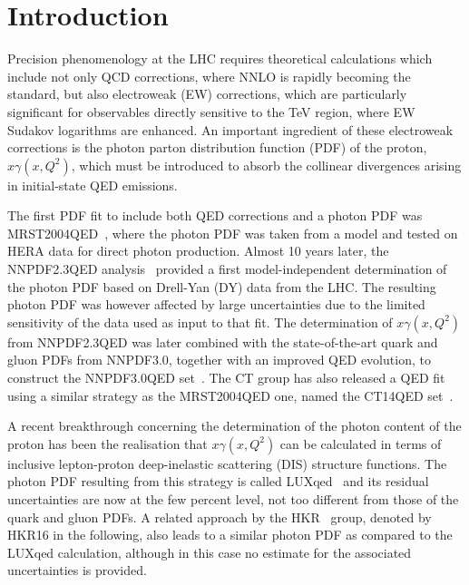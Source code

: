 \section{Introduction}

Precision phenomenology at the LHC requires theoretical calculations
which include not only QCD corrections, where NNLO is rapidly becoming
the standard, but also electroweak (EW) corrections, which are
particularly significant for observables directly sensitive to the TeV
region, where EW Sudakov logarithms are enhanced.
%
An important ingredient of these electroweak corrections is the photon
parton distribution function (PDF) of the proton, $x\gamma(x,Q^2)$, which must be introduced to absorb
the collinear divergences arising in initial-state QED emissions.

The first PDF fit to include both QED corrections and a photon PDF was
MRST2004QED~\cite{Martin:2004dh}, where the photon PDF was taken from
a model and tested on HERA data for direct photon production.
%
Almost 10 years later, the NNPDF2.3QED analysis~\cite{Ball:2012cx,Ball:2013hta} provided a
first model-independent determination of the photon PDF based on
Drell-Yan (DY) data from the LHC.
%
The resulting photon PDF was however affected by large uncertainties
due to the limited sensitivity of the data used as input to that fit.
%
The determination of $x\gamma(x,Q^2)$ from NNPDF2.3QED was later combined
with the state-of-the-art quark and gluon
PDFs from NNPDF3.0, together with an improved QED evolution,
to construct the NNPDF3.0QED set~\cite{Bertone:2016ume,Ball:2014uwa}.
%
The CT group has also  released a QED fit using a similar
strategy as the MRST2004QED one, named the CT14QED set~\cite{Schmidt:2015zda}.

A recent breakthrough concerning the determination of the photon content of
the proton
has been the realisation that  $x\gamma(x,Q^2)$
can be calculated in terms of
inclusive lepton-proton deep-inelastic scattering (DIS) structure functions.
%
The photon PDF resulting from this
strategy is called  LUXqed~\cite{Manohar:2016nzj} and its residual uncertainties are now at the few
percent level, not too different from those
of the quark and gluon PDFs.
%
A related approach by the HKR~\cite{Harland-Lang:2016apc}
group, denoted by HKR16 in the following, also leads to a similar photon PDF
as compared to the LUXqed calculation, although in this case no estimate
for the associated uncertainties is provided.

